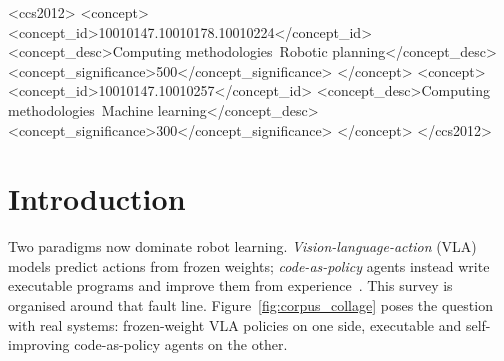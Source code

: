 \documentclass[acmsmall,review,anonymous]{acmart}
\begin{document}
\begin{CCSXML}
<ccs2012>
   <concept>
       <concept_id>10010147.10010178.10010224</concept_id>
       <concept_desc>Computing methodologies~Robotic planning</concept_desc>
       <concept_significance>500</concept_significance>
   </concept>
   <concept>
       <concept_id>10010147.10010257</concept_id>
       <concept_desc>Computing methodologies~Machine learning</concept_desc>
       <concept_significance>300</concept_significance>
   </concept>
</ccs2012>
\end{CCSXML}


\maketitle

%
\section{Introduction}
\label{sec:intro}

Two paradigms now dominate robot learning. \emph{Vision-language-action} (VLA)
models predict actions from frozen weights; \emph{code-as-policy} agents instead
write executable programs and improve them from experience~\citep{codeaspolicies,aspire}.
This survey is organised around that fault line. Figure~\ref{fig:corpus_collage} poses the question
with real systems: frozen-weight VLA policies on one side, executable and self-improving
code-as-policy agents on the other.
\end{document}
